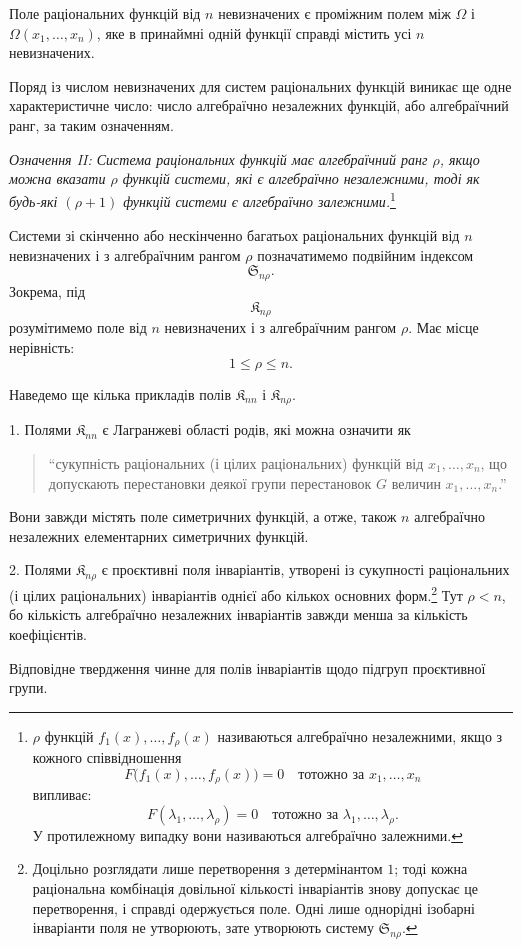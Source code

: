 \documentclass[11pt]{article}
\providecommand{\Kfield}{\mathfrak{K}}
\providecommand{\Ssys}{\mathfrak{S}}
\begin{document}
Поле раціональних функцій від $n$ невизначених є проміжним полем між $\Omega$ і $\Omega(x_1,\ldots,x_n)$, яке в принаймні одній функції справді містить усі $n$ невизначених.

Поряд із числом невизначених для систем раціональних функцій виникає ще одне характеристичне число: число алгебраїчно незалежних функцій, або алгебраїчний ранг, за таким означенням.

\emph{Означення II: Система раціональних функцій має алгебраїчний ранг $\rho$, якщо можна вказати $\rho$ функцій системи, які є алгебраїчно незалежними, тоді як будь-які $(\rho+1)$ функцій системи є алгебраїчно залежними.}\footnote{$\rho$ функцій $f_1(x),\ldots,f_\rho(x)$ називаються алгебраїчно незалежними, якщо з кожного співвідношення
\[
F\bigl(f_1(x),\ldots,f_\rho(x)\bigr)=0\quad\text{тотожно за }x_1,\ldots,x_n
\]
випливає:
\[
F(\lambda_1,\ldots,\lambda_\rho)=0\quad\text{тотожно за }\lambda_1,\ldots,\lambda_\rho.
\]
У протилежному випадку вони називаються алгебраїчно залежними.}

Системи зі скінченно або нескінченно багатьох раціональних функцій від $n$ невизначених і з алгебраїчним рангом $\rho$ позначатимемо подвійним індексом
\[
  \Ssys_{n\rho}.
\]
Зокрема, під
\[
  \Kfield_{n\rho}
\]
розумітимемо поле від $n$ невизначених і з алгебраїчним рангом $\rho$. Має місце нерівність:
\[
  1\leq \rho\leq n.
\]

Наведемо ще кілька прикладів полів $\Kfield_{nn}$ і $\Kfield_{n\rho}$.

1. Полями $\Kfield_{nn}$ є Лагранжеві області родів, які можна означити як
\begin{quote}
``сукупність раціональних (і цілих раціональних) функцій від $x_1,\ldots,x_n$, що допускають перестановки деякої групи перестановок $G$ величин $x_1,\ldots,x_n$.''
\end{quote}
Вони завжди містять поле симетричних функцій, а отже, також $n$ алгебраїчно незалежних елементарних симетричних функцій.

2. Полями $\Kfield_{n\rho}$ є проєктивні поля інваріантів, утворені із сукупності раціональних (і цілих раціональних) інваріантів однієї або кількох основних форм.\footnote{Доцільно розглядати лише перетворення з детермінантом $1$; тоді кожна раціональна комбінація довільної кількості інваріантів знову допускає це перетворення, і справді одержується поле. Одні лише однорідні ізобарні інваріанти поля не утворюють, зате утворюють систему $\Ssys_{n\rho}$.} Тут $\rho<n$, бо кількість алгебраїчно незалежних інваріантів завжди менша за кількість коефіцієнтів.

Відповідне твердження чинне для полів інваріантів щодо підгруп проєктивної групи.
\end{document}
